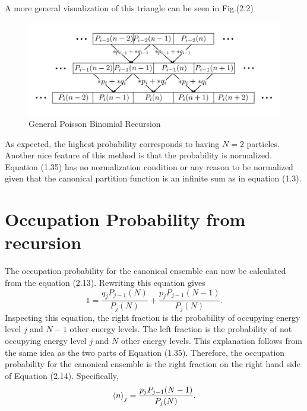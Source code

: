 A more general visualization of this triangle can be seen in Fig.(2.2)
\begin{figure}[H]
    \centering
    \includegraphics[scale=0.8]{figures/pdf/PBrecursion.jpg}
    \caption{General Poisson Binomial Recursion}
    \label{fig:General Poisson Binomial Recursion}
\end{figure}
As expected, the highest probability corresponds to having $N=2$ particles. Another nice feature of this method is that the probability is normalized. Equation (1.35) has no normalization condition or any reason to be normalized given that the canonical partition function is an infinite sum as in equation (1.3).


\section{Occupation Probability from recursion}
The occupation probability for the canonical ensemble can now be calculated from the equation (2.13). Rewriting this equation gives
\begin{equation}
    1=\frac{q_j P_{j-1}(N)}{P_j(N)} + \frac{p_j P_{j-1}(N-1)}{P_j(N)}.
\end{equation}
Inspecting this equation, the right fraction is the probability of occupying energy level $j$ and $N-1$ other energy levels. The left fraction is the probability of not occupying energy level $j$ and $N$ other energy levels. This explanation follows from the same idea as the two parts of Equation (1.35). Therefore, the occupation probability for the canonical ensemble is the right fraction on the right hand side of Equation (2.14). Specifically,
\begin{equation}
    \left<{n}\right>_j=\frac{p_j P_{j-1}(N-1)}{P_j(N)}.
\end{equation}

